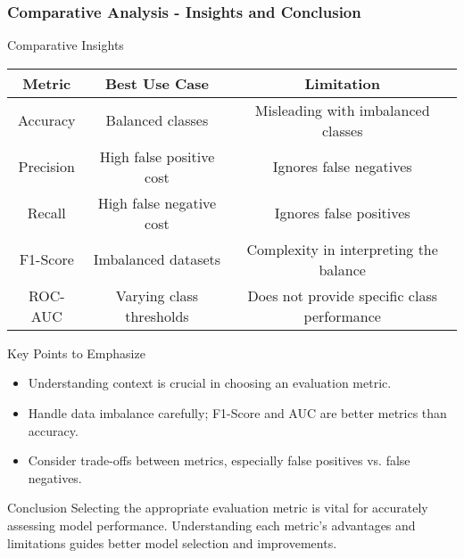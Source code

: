 \documentclass[aspectratio=169]{beamer}
\begin{document}
\begin{frame}[fragile]
    \frametitle{Comparative Analysis - Insights and Conclusion}
    \begin{block}{Comparative Insights}
        \begin{tabular}{|c|c|c|}
            \hline
            Metric & Best Use Case & Limitation \\
            \hline
            Accuracy & Balanced classes & Misleading with imbalanced classes \\
            \hline
            Precision & High false positive cost & Ignores false negatives \\
            \hline
            Recall & High false negative cost & Ignores false positives \\
            \hline
            F1-Score & Imbalanced datasets & Complexity in interpreting the balance \\
            \hline
            ROC-AUC & Varying class thresholds & Does not provide specific class performance \\
            \hline
        \end{tabular}
    \end{block}

    \begin{block}{Key Points to Emphasize}
        \begin{itemize}
            \item Understanding context is crucial in choosing an evaluation metric.
            \item Handle data imbalance carefully; F1-Score and AUC are better metrics than accuracy.
            \item Consider trade-offs between metrics, especially false positives vs. false negatives.
        \end{itemize}
    \end{block}
    
    \begin{block}{Conclusion}
        Selecting the appropriate evaluation metric is vital for accurately assessing model performance. Understanding each metric's advantages and limitations guides better model selection and improvements.
    \end{block}
\end{frame}
\end{document}
